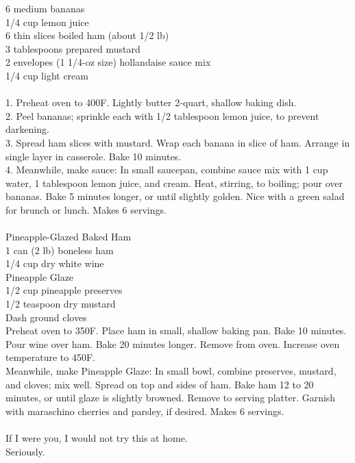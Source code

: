 \documentclass{42-en}
\begin{document}
    6 medium bananas\\
    1/4 cup lemon juice\\
    6 thin slices boiled ham (about 1/2 lb)\\
    3 tablespoons prepared mustard\\
    2 envelopes (1 1/4-oz size) hollandaise sauce mix\\
    1/4 cup light cream\\\\
    1. Preheat oven to 400F. Lightly butter 2-quart, shallow baking dish.\\ 
    2. Peel bananas; sprinkle each with 1/2 tablespoon lemon juice, to prevent darkening.\\
    3. Spread ham slices with mustard. Wrap each banana in slice of ham. Arrange in single layer in casserole. Bake 10 minutes.\\
    4. Meanwhile, make sauce: In small saucepan, combine sauce mix with 1 cup water, 1 tablespoon lemon juice, and cream. Heat, stirring, to boiling; pour over bananas. Bake 5 minutes longer, or until slightly golden. Nice with a green salad for brunch or lunch. Makes 6 servings.\\\\
    Pineapple-Glazed Baked Ham\\
    1 can (2 lb) boneless ham\\
    1/4 cup dry white wine\\
    Pineapple Glaze\\
    1/2 cup pineapple preserves\\
    1/2 teaspoon dry mustard\\
    Dash ground cloves\\
    Preheat oven to 350F. Place ham in small, shallow baking pan. Bake 10 minutes. Pour wine over ham. Bake 20 minutes longer. Remove from oven. Increase oven temperature to 450F.\\
    Meanwhile, make Pineapple Glaze: In small bowl, combine preserves, mustard, and cloves; mix well. Spread on top and sides of ham. Bake ham 12 to 20 minutes, or until glaze is slightly browned. Remove to serving platter. Garnish with maraschino cherries and parsley, if desired. Makes 6 servings.\\\\
    If I were you, I would not try this at home. \\Seriously.
    \newpage
    
\end{document}
